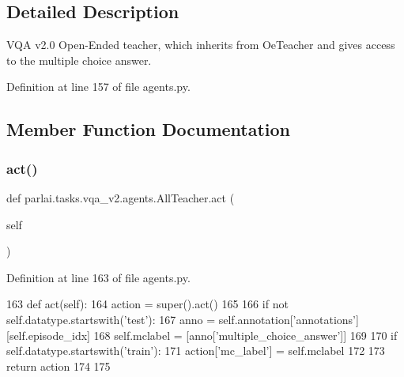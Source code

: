 \subsection{Detailed Description}
\begin{DoxyVerb}VQA v2.0 Open-Ended teacher, which inherits from OeTeacher and gives access to the
multiple choice answer.
\end{DoxyVerb}
 

Definition at line 157 of file agents.\+py.



\subsection{Member Function Documentation}
\mbox{\label{classparlai_1_1tasks_1_1vqa__v2_1_1agents_1_1AllTeacher_a4a97c6641e40361ef66c5c6084eaebea}} 
\subsubsection{\texorpdfstring{act()}{act()}}
{\footnotesize\ttfamily def parlai.\+tasks.\+vqa\+\_\+v2.\+agents.\+All\+Teacher.\+act (\begin{DoxyParamCaption}\item[{}]{self }\end{DoxyParamCaption})}



Definition at line 163 of file agents.\+py.


\begin{DoxyCode}
163     \textcolor{keyword}{def }act(self):
164         action = super().act()
165 
166         \textcolor{keywordflow}{if} \textcolor{keywordflow}{not} self.datatype.startswith(\textcolor{stringliteral}{'test'}):
167             anno = self.annotation[\textcolor{stringliteral}{'annotations'}][self.episode\_idx]
168             self.mclabel = [anno[\textcolor{stringliteral}{'multiple\_choice\_answer'}]]
169 
170         \textcolor{keywordflow}{if} self.datatype.startswith(\textcolor{stringliteral}{'train'}):
171             action[\textcolor{stringliteral}{'mc\_label'}] = self.mclabel
172 
173         \textcolor{keywordflow}{return} action
174 
175 
\end{DoxyCode}


